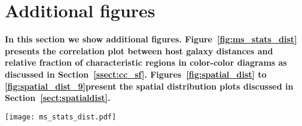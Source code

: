 \documentclass[linenumbers]{aastex63}
\begin{document}
\section{Additional figures}\label{append:add_fig}
\textbf{In this section we show additional figures. Figure~\ref{fig:ms_stats_dist} presents the correlation plot between host galaxy distances and relative fraction of characteristic regions in color-color diagrams as discussed in Section~\ref{ssect:cc_sf}. Figures~\ref{fig:spatial_dist} to \ref{fig:spatial_dist_9}present the spatial distribution plots discussed in Section~\ref{sect:spatialdist}.}
%
\begin{figure*}
\texttt{[image: ms\_stats\_dist.pdf]}
 \caption{\textbf{Number fraction of C1 and C2 clusters of each galaxy associated with the main characteristic regions in color-color diagrams found in Section~\ref{ssect:cc_regions} as a function of galaxy distance. We show the YCL, the MAP and the OGC in blue, green and red, respectively. In gray, we show clusters outside the main regions. We distinguish distance measurements which are estimated from stellar markers such as Tip of the Red giant Branch (TRGB) or from Cepheid variable stars are marked with full circles whereas other distant measurements which are less precise are marked by empty circles. A complete discussion on each individual distance measurement is provided in \citet{anand_distances_2020} and \citet{anand_distances_2021}. For each panel we show the Pearson correlation coefficient in the top right.}}
 \label{fig:ms_stats_dist}
\end{figure*}
%


%
%
%
\end{document}
